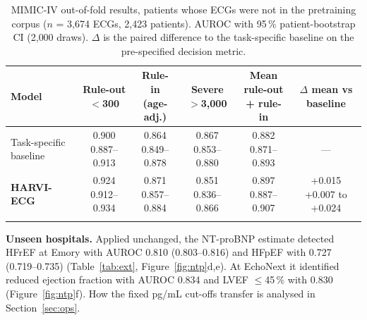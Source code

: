\documentclass[10pt]{article}
\renewcommand{\paragraph}[1]{\textbf{#1}\hspace{0.5em}}
\begin{document}
\begin{table}[t]\centering\small\setlength{\tabcolsep}{4pt}
\caption{MIMIC-IV out-of-fold results, patients whose ECGs were not in the pretraining corpus ($n$ = 3{,}674 ECGs, 2{,}423 patients). AUROC with 95\,\% patient-bootstrap CI (2{,}000 draws). $\Delta$ is the paired difference to the task-specific baseline on the pre-specified decision metric.}\label{tab:unexp}
\begin{tabular}{@{}lccccc@{}}\toprule
Model & \makecell{Rule-out\\$<$300} & \makecell{Rule-in\\(age-adj.)} & \makecell{Severe\\$>$3{,}000} & \makecell{Mean rule-out\\+ rule-in} & \makecell{$\Delta$ mean vs\\baseline} \\\midrule
Task-specific baseline & \makecell{0.900\\ {\scriptsize 0.887--0.913}} & \makecell{0.864\\ {\scriptsize 0.849--0.878}} & \makecell{0.867\\ {\scriptsize 0.853--0.880}} & \makecell{0.882\\ {\scriptsize 0.871--0.893}} & --- \\ \addlinespace[2pt]
\textbf{HARVI-ECG} & \makecell{0.924\\ {\scriptsize 0.912--0.934}} & \makecell{0.871\\ {\scriptsize 0.857--0.884}} & \makecell{0.851\\ {\scriptsize 0.836--0.866}} & \makecell{0.897\\ {\scriptsize 0.887--0.907}} & \makecell{+0.015\\ {\scriptsize +0.007 to +0.024}} \\ \addlinespace[2pt]
\bottomrule\end{tabular}\end{table}


\paragraph{Unseen hospitals.} Applied unchanged, the NT-proBNP estimate detected HFrEF at Emory with AUROC 0.810 (0.803--0.816) and HFpEF with 0.727 (0.719--0.735) (Table~\ref{tab:ext}, Figure~\ref{fig:ntp}d,e). At EchoNext it identified reduced ejection fraction with AUROC 0.834 and LVEF $\le$45\,\% with 0.830 (Figure~\ref{fig:ntp}f). How the fixed pg/mL cut-offs transfer is analysed in Section~\ref{sec:ops}.
\end{document}

